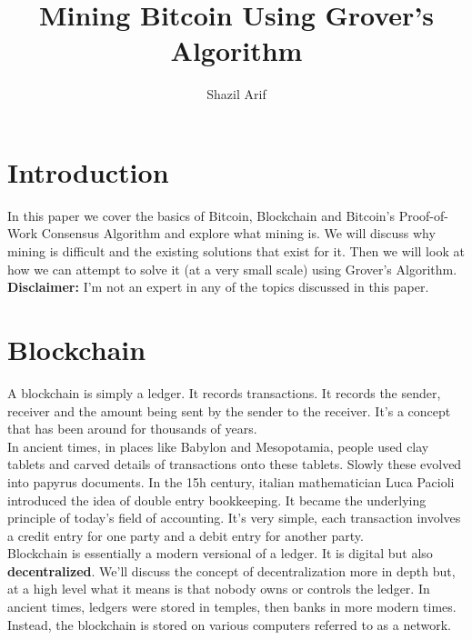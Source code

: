 \documentclass[11pt]{article} %
\title{Mining Bitcoin Using Grover's Algorithm}
\author{Shazil Arif}
\begin{document}
\maketitle

\tableofcontents

\section{Introduction}{}

In this paper we cover the basics of Bitcoin, Blockchain and Bitcoin's Proof-of-Work Consensus Algorithm and explore what mining is. We will discuss why mining is difficult and the existing solutions that exist for it. Then we will look at how we can attempt to solve it (at a very small scale) using Grover's Algorithm.\\


\noindent \textbf{Disclaimer:} I'm not an expert in any of the topics discussed in this paper.

\section{Blockchain}{}

A blockchain is simply a ledger. It records transactions. It records the sender, receiver and the amount being sent by the sender to the receiver. It's a concept that has been around for thousands of years.\\

\noindent In ancient times, in places like Babylon and Mesopotamia, people used clay tablets and carved details of transactions onto these tablets. Slowly these evolved into papyrus documents. In the 15h century, italian mathematician Luca Pacioli introduced the idea of double entry bookkeeping. It became the underlying principle of today's field of accounting. It's very simple, each transaction involves a credit entry for one party and a debit entry for another party.\\

\noindent Blockchain is essentially a modern versional of a ledger. It is digital but also \textbf{decentralized}. We'll discuss the concept of decentralization more in depth but, at a high level what it means is that nobody owns or controls the ledger. In ancient times, ledgers were stored in temples, then banks in more modern times. Instead, the blockchain is stored on various computers referred to as a network.\\
\end{document}

